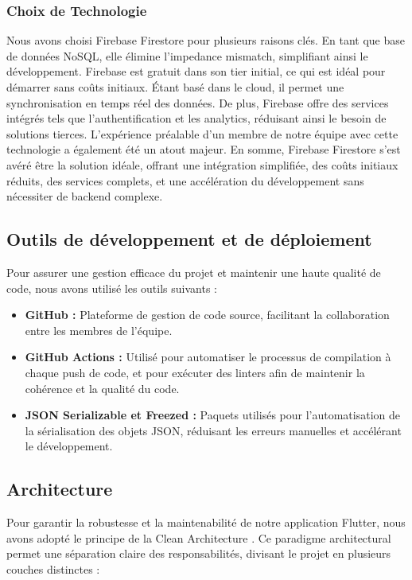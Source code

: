 \subsubsection{Choix de Technologie}
Nous avons choisi Firebase Firestore pour plusieurs raisons clés. En tant que base de données NoSQL, elle élimine l'impedance mismatch, simplifiant ainsi le développement. Firebase est gratuit dans son tier initial, ce qui est idéal pour démarrer sans coûts initiaux. Étant basé dans le cloud, il permet une synchronisation en temps réel des données. De plus, Firebase offre des services intégrés tels que l'authentification et les analytics, réduisant ainsi le besoin de solutions tierces. L'expérience préalable d'un membre de notre équipe avec cette technologie a également été un atout majeur. En somme, Firebase Firestore s'est avéré être la solution idéale, offrant une intégration simplifiée, des coûts initiaux réduits, des services complets, et une accélération du développement sans nécessiter de backend complexe.


\subsection{Outils de développement et de déploiement}

Pour assurer une gestion efficace du projet et maintenir une haute qualité de code, nous avons utilisé les outils suivants :

\begin{itemize}[noitemsep]
    \item \textbf{GitHub :} Plateforme de gestion de code source, facilitant la collaboration entre les membres de l'équipe.
    \item \textbf{GitHub Actions :} Utilisé pour automatiser le processus de compilation à chaque push de code, et pour exécuter des linters afin de maintenir la cohérence et la qualité du code.
    \item \textbf{JSON Serializable et Freezed :} Paquets utilisés pour l'automatisation de la sérialisation des objets JSON, réduisant les erreurs manuelles et accélérant le développement.
\end{itemize}

\subsection{Architecture}
\label{sec:architecture}

Pour garantir la robustesse et la maintenabilité de notre application Flutter, nous avons adopté le principe de la Clean Architecture \cite{cleanArchitecture}. Ce paradigme architectural permet une séparation claire des responsabilités, divisant le projet en plusieurs couches distinctes :

